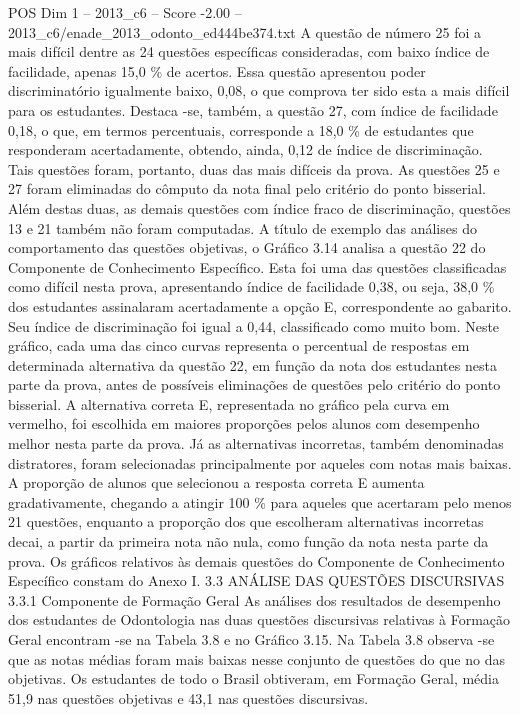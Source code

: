 \begin{textsample}{POS Dim 1 – 2013\_c6 – Score -2.00 – 2013\_c6/enade\_2013\_odonto\_ed444be374.txt}
A questão de número 25 foi a mais difícil dentre as 24 questões específicas consideradas, com baixo índice de facilidade, apenas 15,0 \% de acertos.
Essa questão apresentou poder discriminatório igualmente baixo, 0,08, o que comprova ter sido esta a mais difícil para os estudantes.
Destaca -se, também, a questão 27, com índice de facilidade 0,18, o que, em termos percentuais, corresponde a 18,0 \% de estudantes que responderam acertadamente, obtendo, ainda, 0,12 de índice de discriminação.
Tais questões foram, portanto, duas das mais difíceis da prova.
As questões 25 e 27 foram eliminadas do cômputo da nota final pelo critério do ponto bisserial.
Além destas duas, as demais questões com índice fraco de discriminação, questões 13 e 21 também não foram computadas.
A título de exemplo das análises do comportamento das questões objetivas, o Gráfico 3.14 analisa a questão 22 do Componente de Conhecimento Específico.
Esta foi uma das questões classificadas como difícil nesta prova, apresentando índice de facilidade 0,38, ou seja, 38,0 \% dos estudantes assinalaram acertadamente a opção E, correspondente ao gabarito.
Seu índice de discriminação foi igual a 0,44, classificado como muito bom.
Neste gráfico, cada uma das cinco curvas representa o percentual de respostas em determinada alternativa da questão 22, em função da nota dos estudantes nesta parte da prova, antes de possíveis eliminações de questões pelo critério do ponto bisserial.
A alternativa correta E, representada no gráfico pela curva em vermelho, foi escolhida em maiores proporções pelos alunos com desempenho melhor nesta parte da prova.
Já as alternativas incorretas, também denominadas distratores, foram selecionadas principalmente por aqueles com notas mais baixas.
A proporção de alunos que selecionou a resposta correta E aumenta gradativamente, chegando a atingir 100 \% para aqueles que acertaram pelo menos 21 questões, enquanto a proporção dos que escolheram alternativas incorretas decai, a partir da primeira nota não nula, como função da nota nesta parte da prova.
Os gráficos relativos às demais questões do Componente de Conhecimento Específico constam do Anexo I. 3.3 ANÁLISE DAS QUESTÕES DISCURSIVAS 3.3.1 Componente de Formação Geral As análises dos resultados de desempenho dos estudantes de Odontologia nas duas questões discursivas relativas à Formação Geral encontram -se na Tabela 3.8 e no Gráfico 3.15.
Na Tabela 3.8 observa -se que as notas médias foram mais baixas nesse conjunto de questões do que no das objetivas.
Os estudantes de todo o Brasil obtiveram, em Formação Geral, média 51,9 nas questões objetivas e 43,1 nas questões discursivas.

\end{textsample}

